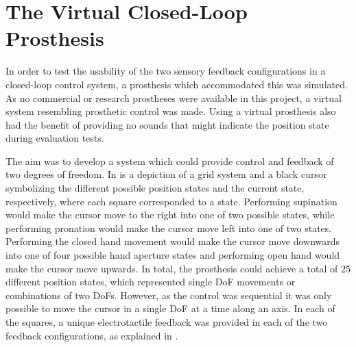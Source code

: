 
\section{The Virtual Closed-Loop Prosthesis} \label{sec:vp}

In order to test the usability of the two sensory feedback configurations in a closed-loop control system, a prosthesis which accommodated this was simulated. As no commercial or research prostheses were available in this project, a virtual system resembling prosthetic control was made. Using a virtual prosthesis also had the benefit of providing no sounds that might indicate the position state during evaluation tests.

The aim was to develop a system which could provide control and feedback of two degrees of freedom. In  is a depiction of a grid system and a black cursor symbolizing the different possible position states and the current state, respectively, where each square corresponded to a state. Performing supination would make the cursor move to the right into one of two possible states, while performing pronation would make the cursor move left into one of two states. Performing the closed hand movement would make the cursor move downwards into one of four possible hand aperture states and performing open hand would make the cursor move upwards. In total, the prosthesis could achieve a total of 25 different position states, which represented single DoF movements or combinations of two DoFs. However, as the control was sequential it was only possible to move the cursor in a single DoF at a time along an axis. In each of the squares, a unique electrotactile feedback was provided in each of the two feedback configurations, as explained in .
     

